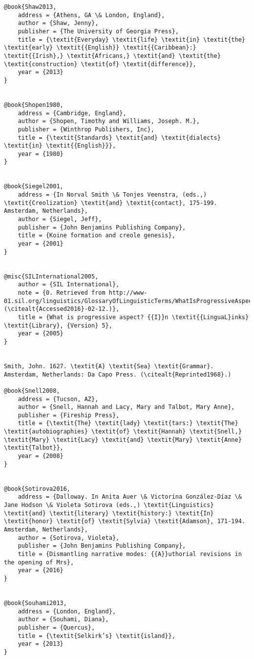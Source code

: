 \begin{verbatim}
@book{Shaw2013,
	address = {Athens, GA \& London, England},
	author = {Shaw, Jenny},
	publisher = {The University of Georgia Press},
	title = {\textit{Everyday} \textit{life} \textit{in} \textit{the} \textit{early} \textit{{English}} \textit{{Caribbean}:} \textit{{Irish},} \textit{Africans,} \textit{and} \textit{the} \textit{construction} \textit{of} \textit{difference}},
	year = {2013}
}


@book{Shopen1980,
	address = {Cambridge, England},
	author = {Shopen, Timothy and Williams, Joseph. M.},
	publisher = {Winthrop Publishers, Inc},
	title = {\textit{Standards} \textit{and} \textit{dialects} \textit{in} \textit{{English}}},
	year = {1980}
}


@book{Siegel2001,
	address = {In Norval Smith \& Tonjes Veenstra, (eds.,) \textit{Creolization} \textit{and} \textit{contact}, 175-199. Amsterdam, Netherlands},
	author = {Siegel, Jeff},
	publisher = {John Benjamins Publishing Company},
	title = {Koine formation and creole genesis},
	year = {2001}
}


@misc{SILInternational2005,
	author = {SIL International},
	note = {0. Retrieved from http://www-01.sil.org/linguistics/GlossaryOfLinguisticTerms/WhatIsProgressiveAspect.htm (\citealt{Accessed2016}-02-12.)},
	title = {What is progressive aspect? {{I}}n \textit{{LinguaL}inks} \textit{Library}, {Version} 5},
	year = {2005}
}


Smith, John. 1627. \textit{A} \textit{Sea} \textit{Grammar}. Amsterdam, Netherlands: Da Capo Press. (\citealt{Reprinted1968}.)

@book{Snell2008,
	address = {Tucson, AZ},
	author = {Snell, Hannah and Lacy, Mary and Talbot, Mary Anne},
	publisher = {Fireship Press},
	title = {\textit{The} \textit{lady} \textit{tars:} \textit{The} \textit{autobiographies} \textit{of} \textit{Hannah} \textit{Snell,} \textit{Mary} \textit{Lacy} \textit{and} \textit{Mary} \textit{Anne} \textit{Talbot}},
	year = {2008}
}


@book{Sotirova2016,
	address = {Dalloway. In Anita Auer \& Victorina González-Díaz \& Jane Hodson \& Violeta Sotirova (eds.,) \textit{Linguistics} \textit{and} \textit{literary} \textit{history:} \textit{In} \textit{honor} \textit{of} \textit{Sylvia} \textit{Adamson}, 171-194. Amsterdam, Netherlands},
	author = {Sotirova, Violeta},
	publisher = {John Benjamins Publishing Company},
	title = {Dismantling narrative modes: {{A}}uthorial revisions in the opening of Mrs},
	year = {2016}
}


@book{Souhami2013,
	address = {London, England},
	author = {Souhami, Diana},
	publisher = {Quercus},
	title = {\textit{Selkirk’s} \textit{island}},
	year = {2013}
}



\end{verbatim}
